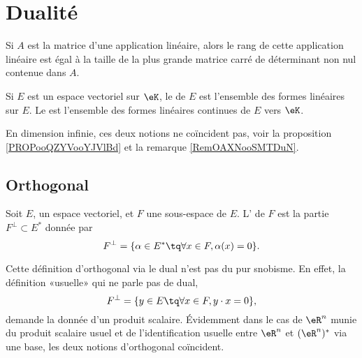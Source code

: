 \section{Dualité}

\begin{proposition} \label{PropEJBZooTNFPRj}
    Si $A$ est la matrice d'une application linéaire, alors le rang de cette application linéaire est égal à la taille de la plus grande matrice carré de déterminant non nul contenue dans $A$.
\end{proposition}

\begin{definition}  \label{DefJPGSHpn}
    Si \( E\) est un espace vectoriel sur \( \eK\), le  de \( E\) est l'ensemble des formes linéaires sur \( E\). Le  est l'ensemble des formes linéaires continues de \( E\) vers \( \eK\).
\end{definition}

En dimension infinie, ces deux notions ne coïncident pas, voir la proposition \ref{PROPooQZYVooYJVlBd} et la remarque \ref{RemOAXNooSMTDuN}.

\subsection{Orthogonal}

\begin{definition}      \label{DEFooEQSMooHVzbfz}
    Soit \( E\), un espace vectoriel, et \( F\) une sous-espace de \( E\). L' de \( F\) est la partie \( F^{\perp}\subset E^*\) donnée par
    \begin{equation}    \label{Eqiiyple}
        F^{\perp}=\{ \alpha\in E^*\tq \forall x\in F,\alpha(x)=0 \}.
    \end{equation}
\end{definition}

Cette définition d'orthogonal via le dual n'est pas du pur snobisme. En effet, la définition «usuelle» qui ne parle pas de dual,
\begin{equation}
    F^{\perp}=\{ y\in E\tq \forall x\in F,y\cdot x=0 \},
\end{equation}
demande la donnée d'un produit scalaire. Évidemment dans le cas de \( \eR^n\) munie du produit scalaire usuel et de l'identification usuelle entre \( \eR^n\) et \( (\eR^n)^*\) via une base, les deux notions d'orthogonal coïncident.

